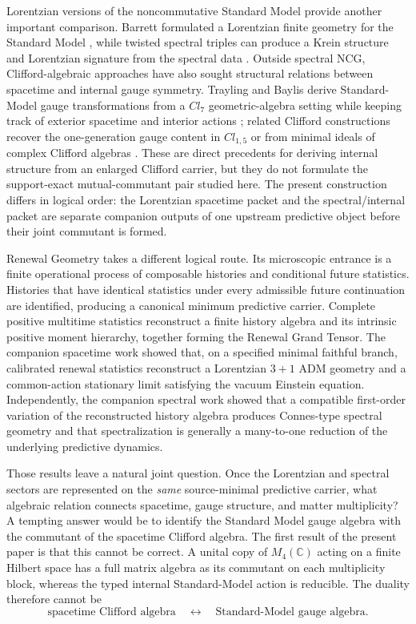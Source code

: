 \documentclass[11pt]{article}
\theoremstyle{definition}
\theoremstyle{remark}
\newcommand{\C}{\mathbb C}
\begin{document}
Lorentzian versions of the noncommutative Standard Model provide another
important comparison.  Barrett formulated a Lorentzian finite geometry for
the Standard Model \cite{Barrett2007}, while twisted spectral triples can
produce a Krein structure and Lorentzian signature from the spectral data
\cite{DevastatoEtAl2018}.  Outside spectral NCG, Clifford-algebraic approaches
have also sought structural relations between spacetime and internal gauge
symmetry.  Trayling and Baylis derive Standard-Model gauge transformations from
a $Cl_7$ geometric-algebra setting while keeping track of exterior spacetime
and interior actions \cite{TraylingBaylis2001}; related Clifford constructions
recover the one-generation gauge content in $Cl_{1,5}$ or from minimal ideals
of complex Clifford algebras \cite{Daviau2017,Gresnigt2020}.  These are direct
precedents for deriving internal structure from an enlarged Clifford carrier,
but they do not formulate the support-exact mutual-commutant pair studied here.
The present construction differs in logical order: the Lorentzian spacetime
packet and the spectral/internal packet are separate companion outputs of one
upstream predictive object before their joint commutant is formed.

Renewal Geometry takes a different logical route.  Its microscopic entrance is
a finite operational process of composable histories and conditional future
statistics.  Histories that have identical statistics under every admissible
future continuation are identified, producing a canonical minimum predictive
carrier.  Complete positive multitime statistics reconstruct a finite history
algebra and its intrinsic positive moment hierarchy, together forming the
Renewal Grand Tensor.  The companion spacetime work
\cite{PelissierSpacetime2026} showed that, on a specified minimal faithful
branch, calibrated renewal statistics reconstruct a Lorentzian $3+1$ ADM
geometry and a common-action stationary limit satisfying the vacuum Einstein
equation.  Independently, the companion spectral work
\cite{PelissierSpectral2026} showed that a compatible first-order variation of
the reconstructed history algebra produces Connes-type spectral geometry and
that spectralization is generally a many-to-one reduction of the underlying
predictive dynamics.

Those results leave a natural joint question.  Once the Lorentzian and
spectral sectors are represented on the \emph{same} source-minimal predictive
carrier, what algebraic relation connects spacetime, gauge structure, and
matter multiplicity?  A tempting answer would be to identify the Standard
Model gauge algebra with the commutant of the spacetime Clifford algebra.  The
first result of the present paper is that this cannot be correct.  A unital
copy of $M_4(\C)$ acting on a finite Hilbert space has a full matrix algebra as
its commutant on each multiplicity block, whereas the typed internal
Standard-Model action is reducible.  The duality therefore cannot be
\[
\text{spacetime Clifford algebra}
\quad\longleftrightarrow\quad
\text{Standard-Model gauge algebra}.
\]
\end{document}
